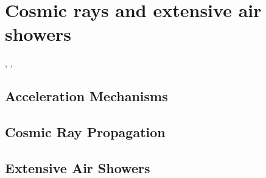 
\chapter{Cosmic rays and extensive air showers}
\label{chap:cosmic-rays}

\cite{test}, \cite{2006}, \cite{Psarra2017}

\section{Acceleration Mechanisms}
\section{Cosmic Ray Propagation}
\section{Extensive Air Showers}